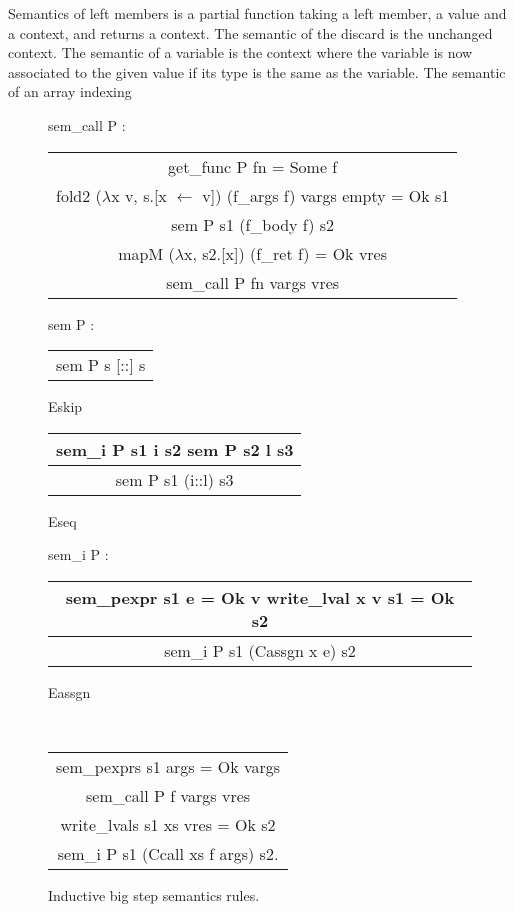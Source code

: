 \documentclass{article}
\begin{document}
Semantics of left members is a partial function taking a left member, a value
and a context, and returns a context.
The semantic of the discard is the unchanged context. The semantic of a variable
is the context where the variable is now associated to the given value if its
type is the same as the variable. The semantic of an array indexing 

\medskip

\begin{figure}
\ttfamily
sem\_call P :
\begin{center}
\begin{tabular}{c}
get\_func P fn = Some f \\
fold2 (\(\lambda\)x v, s.[x \(\leftarrow\) v]) (f\_args f) vargs empty = Ok s1 \\
sem P s1 (f\_body f) s2 \\
mapM (\(\lambda\)x, s2.[x]) (f\_ret f) = Ok vres
\\\hline
sem\_call P fn vargs vres
\end{tabular}
\end{center}

sem P :
\begin{center}
\begin{tabular}{c}
\\\hline
sem P s [::] s
\end{tabular} Eskip\quad
\begin{tabular}{c}
sem\_i P s1 i s2\quad
sem P s2 l s3
\\\hline
sem P s1 (i::l) s3
\end{tabular} Eseq
\end{center}

sem\_i P :
\begin{center}
\begin{tabular}{c}
sem\_pexpr s1 e = Ok v\quad
write\_lval x v s1 = Ok s2
\\\hline
sem\_i P s1 (Cassgn x e) s2
\end{tabular} Eassgn

~

\begin{tabular}{c}
sem\_pexprs s1 args = Ok vargs \\
sem\_call P f vargs vres \\
write\_lvals s1 xs vres = Ok s2
\\\hline
sem\_i P s1 (Ccall xs f args) s2.
\end{tabular} \raisebox{-\baselineskip}{Ecall}
\end{center}
\normalfont%
\caption{Inductive big step semantics rules.}
\end{figure}
\end{document}
